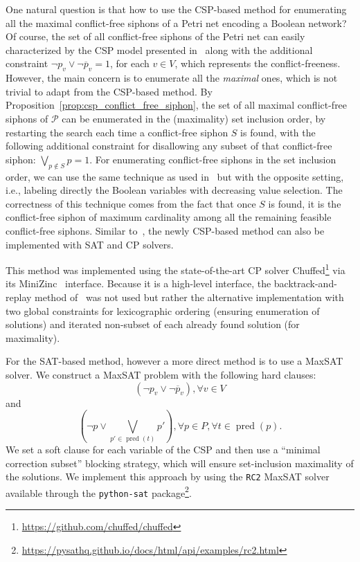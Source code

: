 \documentclass[preprint,12pt]{elsarticle}
\DeclareMathOperator{\pred}{pred}
\begin{document}
One natural question is that how to use the CSP-based method for enumerating all the maximal conflict-free siphons of a Petri net encoding a Boolean network?
Of course, the set of all conflict-free siphons of the Petri net can easily characterized by the CSP model presented in~\cite{nabli2016enumerating} along with the additional constraint \(\neg p_v \vee \neg \overline{p}_v = 1\), for each \(v \in V\), which represents the conflict-freeness.
However, the main concern is to enumerate all the \emph{maximal} ones, which is not trivial to adapt from the CSP-based method.
By Proposition~\ref{prop:csp_conflict_free_siphon}, the set of all maximal conflict-free siphons of \(\mathcal{P}\) can be enumerated in the (maximality) set inclusion order, by restarting the search each time a conflict-free siphon \(S\) is found, with the following additional constraint for disallowing any subset of that conflict-free siphon: \(\bigvee_{p \not \in S} p = 1\).
For enumerating conflict-free siphons in the set inclusion order, we can use the same technique as used in~\cite{nabli2016enumerating} but with the opposite setting, i.e., labeling directly the Boolean variables with decreasing value selection.
The correctness of this technique comes from the fact that once \(S\) is found, it is the conflict-free siphon of maximum cardinality among all the remaining feasible conflict-free siphons.
Similar to~\cite{nabli2016enumerating}, the newly CSP-based method can also be implemented with SAT and CP solvers.

This method was implemented using the state-of-the-art CP solver Chuffed\footnote{\url{https://github.com/chuffed/chuffed}} \cite{demirovic2018solution} via its MiniZinc~\cite{nethercote2007minizinc} interface.
Because it is a high-level interface, the backtrack-and-replay method of~\cite{nabli2016enumerating} was not used but rather the alternative implementation with two global constraints for lexicographic ordering (ensuring enumeration of solutions) and iterated non-subset of each already found solution (for maximality).

For the SAT-based method, however a more direct method is to use a MaxSAT solver.
We construct a MaxSAT problem with the following hard clauses:
\[
  (\neg p_v \vee \neg \overline{p}_v), \forall v \in V
\]
and
\[
  (\neg p \vee \bigvee_{p' \in \pred(t)}p'), \forall p \in P, \forall t \in \pred(p).
\]
We set a soft clause for each variable of the CSP and then use a ``minimal correction subset'' blocking strategy, which will ensure set-inclusion maximality of the solutions.
We implement this approach by using the \texttt{RC2} MaxSAT solver~\cite{DBLP:journals/jsat/IgnatievMM19} available through the \texttt{python-sat} package\footnote{\url{https://pysathq.github.io/docs/html/api/examples/rc2.html}}.
\end{document}
